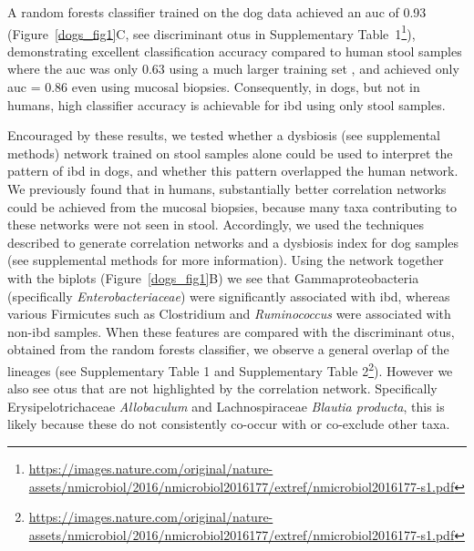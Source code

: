 A random forests classifier \cite{RN4205} trained on the dog data achieved an \gls{auc} of 0.93 (Figure~\ref{dogs_fig1}C, see discriminant \glspl{otu} in Supplementary Table~1\footnote{\url{https://images.nature.com/original/nature-assets/nmicrobiol/2016/nmicrobiol2016177/extref/nmicrobiol2016177-s1.pdf}}), demonstrating excellent classification accuracy compared to human stool samples where the \gls{auc} was only 0.63 using a much larger training set \cite{RN154}, and achieved only \gls{auc} = 0.86 even using mucosal biopsies. Consequently, in dogs, but not in humans, high classifier accuracy is achievable for \gls{ibd} using only stool samples.

Encouraged by these results, we tested whether a dysbiosis (see supplemental methods) network trained on stool samples alone could be used to interpret the pattern of \gls{ibd} in dogs, and whether this pattern overlapped the human network. We previously found that in humans, substantially better correlation networks could be achieved from the mucosal biopsies, because many taxa contributing to these networks were not seen in stool. Accordingly, we used the techniques described \cite{RN154} to generate correlation networks and a dysbiosis index for dog samples (see supplemental methods for more information). Using the network together with the biplots (Figure~\ref{dogs_fig1}B) we see that Gammaproteobacteria (specifically \textit{Enterobacteriaceae}) were significantly associated with \gls{ibd}, whereas various Firmicutes such as Clostridium and \textit{Ruminococcus} were associated with non-\gls{ibd} samples. When these features are compared with the discriminant \glspl{otu}, obtained from the random forests classifier, we observe a general overlap of the lineages (see Supplementary Table 1 and Supplementary Table 2\footnote{\label{sup}\url{https://images.nature.com/original/nature-assets/nmicrobiol/2016/nmicrobiol2016177/extref/nmicrobiol2016177-s1.pdf}}). However we also see \glspl{otu} that are not highlighted by the correlation network. Specifically Erysipelotrichaceae \textit{Allobaculum} and Lachnospiraceae \textit{Blautia producta}, this is likely because these do not consistently co-occur with or co-exclude other taxa.

